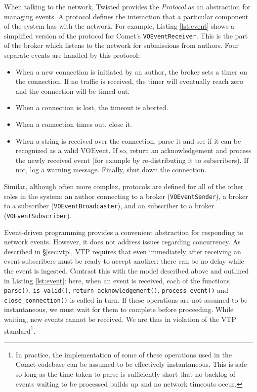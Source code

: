 \documentclass[5p,authoryear]{elsarticle}
\begin{document}
When talking to the network, Twisted provides the \textit{Protocol} as an
abstraction for managing events. A protocol defines the interaction that a
particular component of the system has with the network. For example, Listing
\ref{lst:event} shows a simplified version of the protocol for Comet's
\texttt{VOEventReceiver}. This is the part of the broker which listens to the
network for submissions from authors. Four separate events are handled by this
protocol:

\begin{itemize}

\item{When a new connection is initiated by an author, the broker sets a
timer on the connection. If no traffic is received, the timer will eventually
reach zero and the connection will be timed-out.}

\item{When a connection is lost, the timeout is aborted.}

\item{When a connection times out, close it.}

\item{When a string is received over the connection, parse it and see if it
can be recognized as a valid VOEvent. If so, return an acknowledgement and
process the newly received event (for example by re-distributing it to
subscribers). If not, log a warning message. Finally, shut down the
connection.}

\end{itemize}

Similar, although often more complex, protocols are defined for all of the
other roles in the system: an author connecting to a broker
(\texttt{VOEventSender}), a broker to a subscriber
(\texttt{VOEventBroadcaster}), and an subscriber to a broker
(\texttt{VOEventSubscriber}).

Event-driven programming provides a convenient abstraction for responding to
network events. However, it does not address issues regarding concurrency. As
described in \S\ref{sec:vtp}, VTP requires that even immediately after
receiving an event subscribers must be ready to accept another: there can be
no delay while the event is ingested. Contrast this with the model described
above and outlined in Listing \ref{lst:event}: here, when an event is
received, each of the functions \texttt{parse()}, \texttt{is\_valid()},
\texttt{return\_acknowledgement()}, \texttt{process\_event()} and
\texttt{close\_connection()} is called in turn.  If these operations are not
assumed to be instantaneous, we must wait for them to complete before
proceeding. While waiting, new events cannot be received.  We are thus in
violation of the VTP standard\footnote{In practice, the implementation of some
of these operations used in the Comet codebase can be assumed to be
effectively instantaneous.  This is safe so long as the time taken to parse is
sufficiently short that no backlog of events waiting to be processed  builds
up and no network timeouts occur.}.
\end{document}

